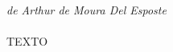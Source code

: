\begin{agradecimentos}

%

\emph{de Arthur de Moura Del Esposte} \\ \\

%

TEXTO

\end{agradecimentos}